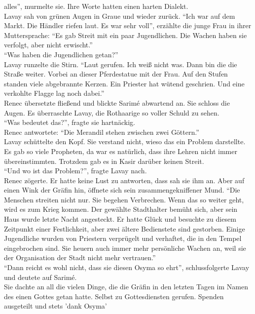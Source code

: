 alles'', murmelte sie. Ihre Worte hatten einen harten Dialekt.\\
Lavay sah von grünen Augen in Graue und wieder zurück. ``Ich war auf dem Markt. Die Händler riefen 
laut. Es war sehr voll'', erzählte die junge Frau in ihrer Muttersprache: ``Es gab Streit mit ein 
paar Jugendlichen. Die Wachen haben sie verfolgt, aber nicht erwischt.''\\
``Was haben die Jugendlichen getan?''\\
Lavay runzelte die Stirn. ``Laut gerufen. Ich weiß nicht was. Dann bin die die Straße weiter. 
Vorbei an dieser Pferdestatue mit der Frau. Auf den Stufen standen viele abgebrannte Kerzen. Ein 
Priester hat wütend geschrien. Und eine verkohlte Flagge lag noch dabei.''\\
Renec übersetzte fließend und blickte Sarimé abwartend an. Sie schloss die Augen. Es überraschte 
Lavay, die Rothaarige so voller Schuld zu sehen.\\
``Was bedeutet das?'', fragte sie hartnäckig.\\
Renec antwortete: ``Die Merandil stehen zwischen zwei Göttern.''\\
Lavay schüttelte den Kopf. Sie verstand nicht, wieso das ein Problem darstellte. Es gab so viele 
Propheten, da war es natürlich, dass ihre Lehren nicht immer übereinstimmten. Trotzdem gab es 
in Kasir darüber keinen Streit.\\
``Und wo ist das Problem?'', fragte Lavay nach.\\
Renec zögerte. Er hatte keine Lust zu antworten, dass sah sie ihm an. Aber auf einen Wink der 
Gräfin hin, öffnete sich sein zusammengekniffener Mund. ``Die Menschen streiten nicht nur. Sie 
begehen Verbrechen. Wenn das so weiter geht, wird es zum Krieg kommen. Der gewählte Stadthalter 
bemüht sich, aber sein Haus wurde letzte Nacht angesteckt. Er hatte Glück und besuchte zu diesem 
Zeitpunkt einer Festlichkeit, aber zwei ältere Bedienstete sind gestorben. Einige Jugendliche 
wurden von Priestern verprügelt und verhaftet, die in den Tempel eingebrochen sind. Sie heuern auch 
immer mehr persönliche Wachen an, weil sie der Organisation der Stadt nicht mehr vertrauen.''\\
``Dann reicht es wohl nicht, dass sie diesen Osyma so ehrt'', schlussfolgerte Lavay und deutete auf 
Sarimé.\\
Sie dachte an all die vielen Dinge, die die Gräfin in den letzten Tagen im Namen des einen Gottes 
getan hatte. Selbst zu Gottesdiensten gerufen. Spenden ausgeteilt und stets 'dank Osyma' 
